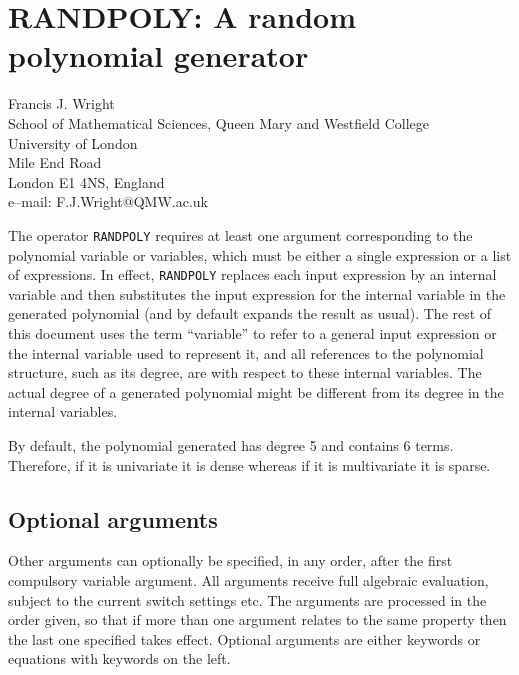 \chapter[RANDPOLY: Random polynomials]%
{RANDPOLY: A random polynomial generator}
\label{RANDPOLY}

{\footnotesize
\begin{center}
Francis J. Wright \\
School of Mathematical Sciences, Queen Mary and Westfield College \\
University of London \\
Mile End Road \\
London E1 4NS, England \\[0.05in]
e--mail: F.J.Wright@QMW.ac.uk
\end{center}
}

The operator {\tt RANDPOLY} requires at least one
argument corresponding to the polynomial variable or variables, which
must be either a single expression or a list of expressions.
In effect, {\tt RANDPOLY} replaces each input expression by an
internal variable and then substitutes the input expression for the
internal variable in the generated polynomial (and by default expands
the result as usual).  The rest of this document
uses the term ``variable'' to refer to a general input expression or
the internal variable used to represent it, and all references to the
polynomial structure, such as its degree, are with respect to these
internal variables.  The actual degree of a generated polynomial might
be different from its degree in the internal variables.

By default, the polynomial generated has degree 5 and contains 6
terms.  Therefore, if it is univariate it is dense whereas if it is
multivariate it is sparse.

\section{Optional arguments}

Other arguments can optionally be specified, in any order, after the
first compulsory variable argument.  All arguments receive full
algebraic evaluation, subject to the current switch settings etc.  The
arguments are processed in the order given, so that if more than one
argument relates to the same property then the last one specified
takes effect.  Optional arguments are either keywords or equations
with keywords on the left.

